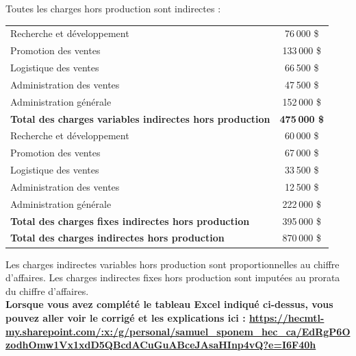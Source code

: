 \documentclass{kaobook}
\begin{document}
Toutes les charges hors production sont indirectes :\\
\begin{center}
\begin{tabular}{l c}
Recherche et développement & 76 000 \$\\
Promotion des ventes & 133 000 \$\\
Logistique des ventes & 66 500 \$\\
Administration des ventes & 47 500 \$\\
Administration générale & 152 000 \$\\
\textbf{Total des charges variables indirectes hors production} & \textbf{475 000 \$}\\
Recherche et développement & 60 000 \$\\
Promotion des ventes & 67 000 \$\\
Logistique des ventes & 33 500 \$\\
Administration des ventes & 12 500 \$\\
Administration générale & 222 000 \$\\
\textbf{Total des charges fixes indirectes hors production} & 395 000 \$\\
\textbf{Total des charges indirectes hors production} & 870 000 \$\\
\end{tabular}
\end{center}
Les charges indirectes variables hors production sont proportionnelles au chiffre d’affaires. Les charges indirectes fixes hors production sont imputées au prorata du chiffre d’affaires.\\

\textbf{Lorsque vous avez complété le tableau Excel indiqué ci-dessus, vous pouvez aller voir le corrigé et les explications ici : \url{https://hecmtl-my.sharepoint.com/:x:/g/personal/samuel\_sponem\_hec\_ca/EdRgP6OzodhOmw1Vx1xdD5QBcdACuGuABceJAsaHInp4vQ?e=I6F40h}}\\
\end{document}
